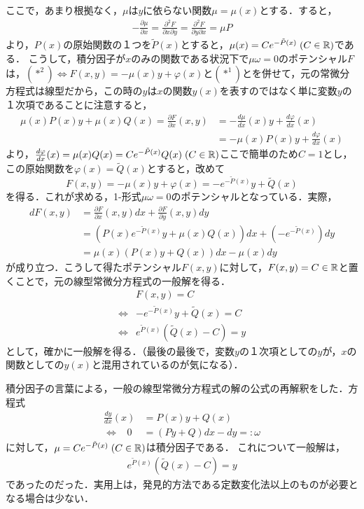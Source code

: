 \documentclass[uplatex,dvipdfmx]{jsreport}
\begin{document}
\begin{example}[積分因子による一般の線型常微分方程式の第一積分の構成法]
    ここで，あまり根拠なく，$\mu$は$y$に依らない関数$\mu=\mu(x)$とする．すると，
    \begin{align*}
        -\frac{\partial\mu}{\partial x}=\frac{\partial^2F}{\partial x\partial y}=\frac{\partial^2F}{\partial y\partial x}=\mu P
    \end{align*}
    より，$P(x)$の原始関数の１つを$\tilde{P}(x)$とすると，$\mu(x)=Ce^{-\tilde{P}(x)}\;(C\in\mathbb{R})$である．
    こうして，積分因子が$x$のみの関数である状況下で$\mu\omega=0$のポテンシャル$F$は，$(*^2)\Leftrightarrow F(x,y)=-\mu(x)y+\varphi(x)$と$(*^1)$とを併せて，元の常微分方程式は線型だから，この時の$y$は$x$の関数$y(x)$を表すのではなく単に変数$y$の１次項であることに注意すると，
    \begin{align*}
        \mu(x)P(x)y+\mu(x)Q(x) = \frac{\partial F}{\partial x}(x,y) &= -\frac{d\mu}{dx}(x)y+\frac{d\varphi}{dx}(x)\\
        &= -\mu(x)P(x)y+\frac{d\varphi}{dx}(x)
    \end{align*}
    より，$\frac{d\varphi}{dx}(x)=\mu(x)Q(x)=Ce^{-\tilde{P}(x)}Q(x)\;(C\in\mathbb{R})$ここで簡単のため$C=1$とし，この原始関数を$\varphi(x)=\tilde{Q}(x)$とすると，改めて
    \[ F(x,y)=-\mu(x)y+\varphi(x) = - e^{-\tilde{P}(x)}y+\tilde{Q}(x) \]
    を得る．これが求める，1-形式$\mu\omega=0$のポテンシャルとなっている．実際，
    \begin{align*}
        dF(x,y) &= \frac{\partial F}{\partial x}(x,y)dx + \frac{\partial F}{\partial y}(x,y)dy\\
        &= \left( P(x)e^{-\tilde{P}(x)}y+\mu(x)Q(x) \right)dx + \left( -e^{-\tilde{P}(x)} \right)dy\\
        &= \mu(x)\left( P(x)y+Q(x) \right)dx - \mu(x)dy
    \end{align*}
    が成り立つ．こうして得たポテンシャル$F(x,y)$に対して，$F(x,y)=C\in\mathbb{R}$と置くことで，元の線型常微分方程式の一般解を得る．
    \begin{align*}
        &F(x,y) = C\\
        \Leftrightarrow& -e^{-\tilde{P}(x)}y+\tilde{Q}(x) = C\\
        \Leftrightarrow& e^{\tilde{P}(x)}\left( \tilde{Q}(x)-C \right)=y
    \end{align*}
    として，確かに一般解を得る．（最後の最後で，変数$y$の１次項としての$y$が，$x$の関数としての$y(x)$と混用されているのが気になる）．
\end{example}

\begin{screen}
    積分因子の言葉による，一般の線型常微分方程式の解の公式の再解釈をした．方程式
    \begin{align*}
        \frac{dy}{dx}(x) &= P(x)y+Q(x)\\
        \Leftrightarrow\;\;\; 0&= (Py+Q)dx-dy =:\omega
    \end{align*}
    に対して，$\mu=Ce^{-\tilde{P}(x)}\;(C\in\mathbb{R})$は積分因子である．
    これについて一般解は，
    \begin{align*}
        e^{\tilde{P}(x)}\left( \tilde{Q}(x)-C \right)=y
    \end{align*}
    であったのだった．実用上は，発見的方法である定数変化法以上のものが必要となる場合は少ない．
\end{screen}
\end{document}
